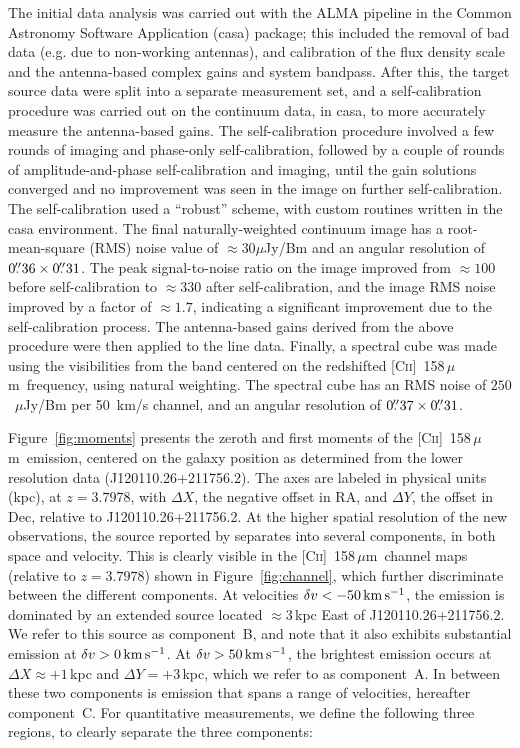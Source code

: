 \documentclass[twocolumn]{aastex62}
\newcommand{\origpos}{J120110.26+211756.2}
\newcommand{\cplus}{[\ctwo]~158\,$\mu$m}
\newcommand{\mkms}{\rm km \, s^{-1}}
\newcommand{\ctwo}{C\textsc{ii}}
\begin{document}
The initial data analysis was carried out with the ALMA pipeline in the Common Astronomy Software Application ({\sc casa}) package; this included the removal of bad data (e.g. due to non-working antennas), and calibration of the flux density scale and the antenna-based complex gains and system bandpass. After this, the target source data were split into a separate measurement set, and a self-calibration procedure was carried out on the continuum data, in {\sc casa}, to more accurately measure the antenna-based gains. The self-calibration procedure involved a few rounds of imaging and phase-only self-calibration, followed by a couple of rounds of amplitude-and-phase self-calibration and imaging, until the gain solutions converged and no improvement was seen in the image on further 
self-calibration. The self-calibration used a ``robust'' scheme, with custom 
routines written in the {\sc casa} environment. The final naturally-weighted continuum 
image has a root-mean-square (RMS) noise value of $\approx 30 \mu$Jy/Bm and an angular 
resolution of $0\mbox{$.\!\!^{\prime\prime}$}36 \times 0\mbox{$.\!\!^{\prime\prime}$}31$. The peak signal-to-noise ratio on the image improved from $\approx 100$ before self-calibration to $\approx 330$ after self-calibration, and the image RMS noise improved by a factor of $\approx 1.7$, indicating a significant improvement due to the self-calibration process. The antenna-based gains derived from the above procedure were then applied to the line data. Finally, a spectral cube was made using the visibilities from the band centered on the redshifted \cplus\ frequency, using natural 
weighting. The spectral cube has an RMS noise of $250$~$\mu$Jy/Bm per 50~km/s channel, 
and an angular resolution of $0\mbox{$.\!\!^{\prime\prime}$}37 \times 0\mbox{$.\!\!^{\prime\prime}$}31$.

Figure~\ref{fig:moments} presents the zeroth and first moments of the \cplus\ emission, 
centered on the galaxy position as determined from the lower resolution data (\origpos). The axes are labeled in physical units (kpc), at $z=3.7978$, with 
$\Delta X$, the negative offset in RA, and $\Delta Y$, the offset in Dec, relative to 
\origpos. At the higher spatial resolution of the new observations, the source reported 
by \citet{neeleman+17} separates into several components, in both space and velocity. 
This is clearly visible in the \cplus\ channel maps (relative to $z=3.7978$) shown in 
Figure~\ref{fig:channel}, which further discriminate between the different components. 
At velocities $\delta v < -50 \, \mkms$, the emission is 
dominated by an extended source located $\approx 3$\,kpc East of \origpos. We refer to 
this source as component~B, and note that it also exhibits substantial emission at $\delta v > 0 \, \mkms$.
At $\delta v > 50 \, \mkms$, the brightest emission occurs 
at $\Delta X \approx +1$\,kpc and $\Delta Y = +3$\,kpc, which we refer to as component~A. 
In between these two components is emission that spans a range of velocities, hereafter 
component~C. For quantitative measurements, we define the following three regions, to 
clearly separate the three components:
\end{document}
